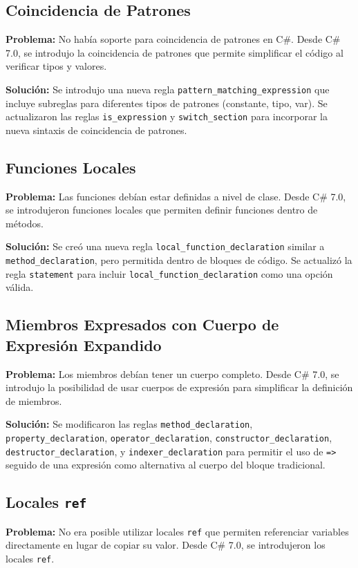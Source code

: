 \subsection*{Coincidencia de Patrones}
\textbf{Problema:} No había soporte para coincidencia de patrones en C\#. Desde C\# 7.0, se introdujo la coincidencia de patrones que permite simplificar el código al verificar tipos y valores.

\textbf{Solución:} Se introdujo una nueva regla \texttt{pattern\_matching\_expression} que incluye subreglas para diferentes tipos de patrones (constante, tipo, var). Se actualizaron las reglas \texttt{is\_expression} y \texttt{switch\_section} para incorporar la nueva sintaxis de coincidencia de patrones.

\subsection*{Funciones Locales}
\textbf{Problema:} Las funciones debían estar definidas a nivel de clase. Desde C\# 7.0, se introdujeron funciones locales que permiten definir funciones dentro de métodos.

\textbf{Solución:} Se creó una nueva regla \texttt{local\_function\_declaration} similar a \texttt{method\_declaration}, pero permitida dentro de bloques de código. Se actualizó la regla \texttt{statement} para incluir \texttt{local\_function\_declaration} como una opción válida.

\subsection*{Miembros Expresados con Cuerpo de Expresión Expandido}
\textbf{Problema:} Los miembros debían tener un cuerpo completo. Desde C\# 7.0, se introdujo la posibilidad de usar cuerpos de expresión para simplificar la definición de miembros.

\textbf{Solución:} Se modificaron las reglas \texttt{method\_declaration}, \texttt{property\_declaration}, \texttt{operator\_declaration}, \texttt{constructor\_declaration}, \texttt{destructor\_declaration}, y \texttt{indexer\_declaration} para permitir el uso de \texttt{=>} seguido de una expresión como alternativa al cuerpo del bloque tradicional.

\subsection*{Locales \texttt{ref}}
\textbf{Problema:} No era posible utilizar locales \texttt{ref} que permiten referenciar variables directamente en lugar de copiar su valor. Desde C\# 7.0, se introdujeron los locales \texttt{ref}.

